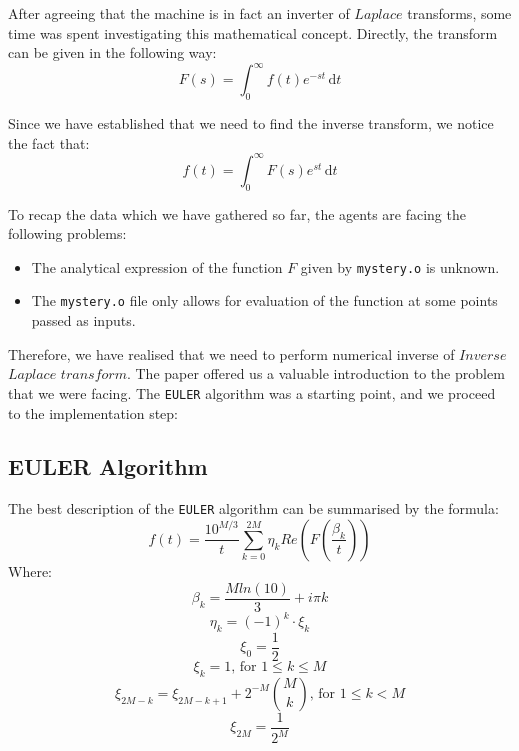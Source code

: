 After agreeing that the machine is in fact an inverter of $Laplace$ transforms, some time was spent investigating 
this mathematical concept. Directly, the transform can be given in the following way:
$$F(s) =\int_0^\infty \! f(t)e^{-st} \, \mathrm{d}t$$

Since we have established that we need to find the inverse transform, we notice the fact that:
$$f(t) =\int_0^\infty \! F(s)e^{st} \, \mathrm{d}t$$
\newline

To recap the data which we have gathered so far, the agents are facing the following problems:
\begin{itemize}
\item{The analytical expression of the function $F$ given by \texttt{mystery.o} is unknown. }
\item{The \texttt{mystery.o} file only allows for evaluation of the function at some points passed as inputs. }
\end{itemize}

Therefore, we have realised that we need to perform numerical inverse of $Inverse$ $Laplace$ $transform$.
The paper offered us a valuable introduction to the problem that we were facing.
The \texttt{EULER} algorithm was a starting point, and we proceed to the implementation step:

\subsection{EULER Algorithm}
The best description of the \texttt{EULER} algorithm can be summarised by the formula:
$$f(t) = \frac{10^{M/3}}{t} \sum\limits_{k=0}^{2M} {\eta_k Re( F(\frac{\beta_k}{t}) )}$$
Where:
$$\beta_k = \frac{M ln(10)}{3} + i\pi k$$
$$\eta_k = (-1)^{k} \cdot \xi_k$$
$$\xi_0 = \frac{1}{2}$$
$$\xi_k = 1 \text{, for } 1 \leq k \leq M$$
$$\xi_{2M-k} = \xi_{2M-k+1}+2^{-M}\binom{M}{k} \text{, for } 1 \leq k < M$$
$$\xi_{2M} = \frac{1}{2^M}$$
\newline

